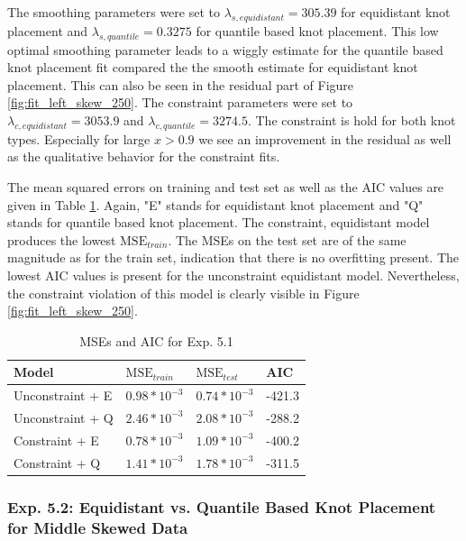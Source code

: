 \documentclass[10pt,a4paper]{article}
\begin{document}
The smoothing parameters were set to $\lambda_{s, equidistant} = 305.39$ for equidistant knot placement and $\lambda_{s, quantile} = 0.3275$ for quantile based knot placement. This low optimal smoothing parameter leads to a wiggly estimate for the quantile based knot placement fit compared the the smooth estimate for equidistant knot placement. This can also be seen in the residual part of Figure \ref{fig:fit_left_skew_250}. The constraint parameters were set to $\lambda_{c, equidistant} = 3053.9$ and $\lambda_{c, quantile} = 3274.5$. The constraint is hold for both knot types. Especially for large $x > 0.9$ we see an improvement in the residual as well as the qualitative behavior for the constraint fits. 

The mean squared errors on training and test set as well as the AIC values are given in Table \ref{tab:metrics_51}. Again, "E" stands for equidistant knot placement and "Q" stands for quantile based knot placement. The constraint, equidistant model produces the lowest $\text{MSE}_{train}$. The MSEs on the test set are of the same magnitude as for the train set, indication that there is no overfitting present. The lowest AIC values is present for the unconstraint equidistant model. Nevertheless, the constraint violation of this model is clearly visible in Figure \ref{fig:fit_left_skew_250}.

\begin{table}[H]
	\centering
	\begin{tabular}{|l|l|l|l|}
		\hline
		\textbf{Model} & \textbf{$\text{MSE}_{train}$} & \textbf{$\text{MSE}_{test}$}  & \textbf{AIC} \\ \hline \toprule
		Unconstraint + E  & $0.98 * 10^{-3}$  & $0.74 * 10^{-3}$ & -421.3       \\ \hline
		Unconstraint + Q  & $2.46 * 10^{-3}$  & $2.08 * 10^{-3}$ & -288.2       \\ \hline
		Constraint + E    & $0.78 * 10^{-3}$  & $1.09 * 10^{-3}$ & -400.2       \\ \hline
		Constraint + Q    & $1.41 * 10^{-3}$  & $1.78 * 10^{-3}$ & -311.5      \\ \hline \bottomrule
	\end{tabular}
	\caption{MSEs and AIC for Exp. 5.1}
	\label{tab:metrics_51}
\end{table}


\subsubsection{Exp. 5.2: Equidistant vs. Quantile Based Knot Placement for Middle Skewed Data}
\end{document}
